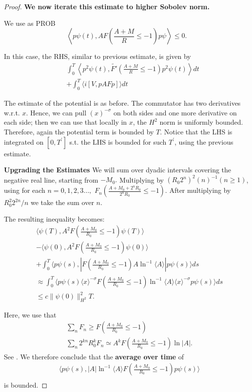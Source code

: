 \documentclass[11pt]{article}
\begin{document}
\begin{proof}
{\bf We now iterate this estimate to higher Sobolev norm.}


We use as PROB
\begin{equation}
\left\langle p \psi(t), A F\left(\frac{A+M}{R} \leq-1\right) p \psi\right\rangle \leq 0 .
\end{equation}

In this case, the RHS, similar to previous estimate, is given by
$$
\begin{aligned}
 \quad & \int_{0}^{T}\left\langle p^{2} \psi(t), \tilde{F'}\left(\frac{A+M}{R} \leqslant-1\right) p^{2} \psi(t)\right\rangle d t \\
& +\int_{0}^{T}\langle i[V, p A F p]\rangle d t
\end{aligned}
$$

The estimate of the potential is as before. The commutator has two derivatives w.r.t. $x$. Hence, we can pull $(x)^{-\sigma}$ on both sides and one more derivative on each side; then we can use that locally in $x$, the $H^{2}$ norm is uniformly bounded.
Therefore, again the potential term is bounded by $T.$ Notice that the LHS is integrated on $\left[0, T^{\prime}\right]$ s.t. the LHS is bounded for such $T^{\prime}$, using the previous estimate.

{\bf Upgrading the Estimates}
  We will sum over dyadic intervals covering the negative real line, starting from $-M_0.$
 Multiplying by $\left(R_{0} 2^{n}\right)^{2}( n)^{-1}(n \geqslant 1)$,
using for each $n=0,1,2,3...,$  \quad $F_n(\frac{A+M_0+2^nR_0}{2^nR_0}\leq -1).$
After multiplying by $R_0^2 2^{2n}/n$ we take the sum over $n.$


The resulting inequality becomes:
\begin{align}
&\langle\psi(T),A^2F(\frac{A+M_0}{R_0}\leq -1)\psi(T)\rangle\\
&-\langle\psi(0),A^2F(\frac{A+M_0}{R_0}\leq -1)\psi(0)\rangle\\
&+\int_0^T\langle p\psi(s),|F(\frac{A+M_0}{R_0}\leq -1)A\ln^{-1}{\langle A\rangle}|p\psi(s)\rangle ds\\
&\approx\int_0^T\langle p\psi(s)\langle x \rangle^{-\sigma} F(\frac{A+M_0}{R_0}\leq -1)\ln^{-1}{\langle A\rangle}\langle x \rangle^{-\sigma}p \psi(s)\rangle ds\\
&\leq c\|\psi(0)\|^2_{H^2} T.
\end{align}

Here, we use that 
\begin{align}
&\sum_n F_n\geq   F(\frac{A+M_0}{R_0}\leq -1)\\
& \sum_n 2^{kn}R_0^kF_n \simeq A^k  F(\frac{A+M_0}{R_0}\leq -1) \ln{|A|}.
\end{align}
 See \cite{liu2025large}.
 We therefore conclude that the {\bf average over time} of 
 \begin{align}
&\langle p\psi(s),|A|\ln^{-1}{\langle A\rangle}F(\frac{A+M_0}{R_0}\leq -1)p\psi(s)\rangle\\
\end{align}
is bounded.





\end{proof}
\end{document}

